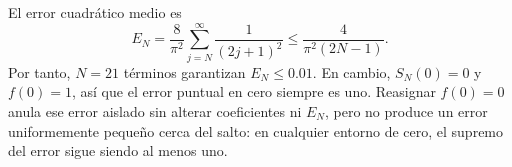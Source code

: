 El error cuadrático medio es
\[
E_N=\frac8{\pi^2}\sum_{j=N}^{\infty}\frac1{(2j+1)^2}
\le\frac4{\pi^2(2N-1)}.
\]
Por tanto, \(N=21\) términos garantizan \(E_N\le0.01\). En cambio, \(S_N(0)=0\) y \(f(0)=1\), así que el error puntual en cero siempre es uno. Reasignar \(f(0)=0\) anula ese error aislado sin alterar coeficientes ni \(E_N\), pero no produce un error uniformemente pequeño cerca del salto: en cualquier entorno de cero, el supremo del error sigue siendo al menos uno.
